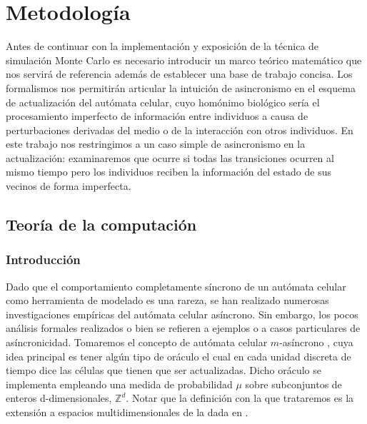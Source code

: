 \documentclass[../proyecto.tex]{memoir}
\begin{document}
\chapter{Metodología}

Antes de continuar con la implementación y exposición de la técnica de simulación Monte Carlo es necesario introducir un marco teórico matemático que nos servirá de referencia además de establecer una base de trabajo concisa. Los formalismos nos permitirán articular la intuición de asincronismo en el esquema de actualización del autómata celular, cuyo homónimo biológico sería el procesamiento imperfecto de información entre individuos a causa de perturbaciones derivadas del medio o de la interacción con otros individuos. En este trabajo nos restringimos a un caso simple de asincronismo en la actualización: examinaremos que ocurre si todas las transiciones ocurren al mismo tiempo pero los individuos reciben la información del estado de sus vecinos de forma imperfecta.



\section{Teoría de la computación}

\subsection{Introducción}
Dado que el comportamiento completamente síncrono de un autómata celular como herramienta de modelado es una rareza, se han realizado numerosas investigaciones empíricas del autómata celular asíncrono. Sin embargo, los pocos análisis formales realizados o bien se refieren a ejemplos o a casos particulares de asíncronicidad. Tomaremos el concepto de autómata celular $m$-asíncrono \cite{oraculo}, cuya idea principal es tener algún tipo de oráculo el cual en cada unidad discreta de tiempo dice las células que tienen que ser actualizadas. Dicho oráculo se implementa empleando una medida de probabilidad $\mu$ sobre subconjuntos de enteros d-dimensionales, $\mathds{Z}^{d}$. Notar que la definición con la que trataremos es la extensión a espacios multidimensionales de la dada en \cite{oraculo}.
\end{document}
